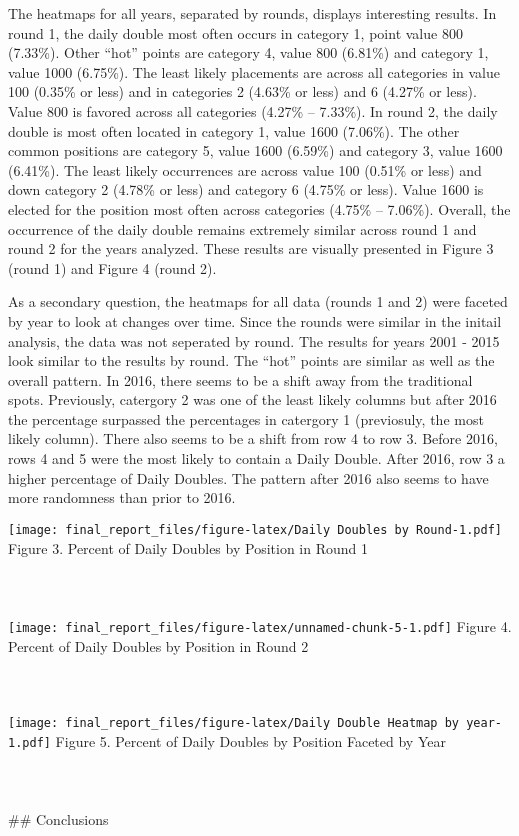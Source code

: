 \documentclass[]{article}
\begin{document}
The heatmaps for all years, separated by rounds, displays interesting
results. In round 1, the daily double most often occurs in category 1,
point value 800 (7.33\%). Other ``hot'' points are category 4, value 800
(6.81\%) and category 1, value 1000 (6.75\%). The least likely
placements are across all categories in value 100 (0.35\% or less) and
in categories 2 (4.63\% or less) and 6 (4.27\% or less). Value 800 is
favored across all categories (4.27\% -- 7.33\%). In round 2, the daily
double is most often located in category 1, value 1600 (7.06\%). The
other common positions are category 5, value 1600 (6.59\%) and category
3, value 1600 (6.41\%). The least likely occurrences are across value
100 (0.51\% or less) and down category 2 (4.78\% or less) and category 6
(4.75\% or less). Value 1600 is elected for the position most often
across categories (4.75\% -- 7.06\%). Overall, the occurrence of the
daily double remains extremely similar across round 1 and round 2 for
the years analyzed. These results are visually presented in Figure 3
(round 1) and Figure 4 (round 2).

As a secondary question, the heatmaps for all data (rounds 1 and 2) were
faceted by year to look at changes over time. Since the rounds were
similar in the initail analysis, the data was not seperated by round.
The results for years 2001 - 2015 look similar to the results by round.
The ``hot'' points are similar as well as the overall pattern. In 2016,
there seems to be a shift away from the traditional spots. Previously,
catergory 2 was one of the least likely columns but after 2016 the
percentage surpassed the percentages in catergory 1 (previosuly, the
most likely column). There also seems to be a shift from row 4 to row 3.
Before 2016, rows 4 and 5 were the most likely to contain a Daily
Double. After 2016, row 3 a higher percentage of Daily Doubles. The
pattern after 2016 also seems to have more randomness than prior to
2016.

\texttt{[image: final\_report\_files/figure-latex/Daily Doubles by Round-1.pdf]}
Figure 3. Percent of Daily Doubles by Position in Round 1\\
~\\
~\\
~\\
\texttt{[image: final\_report\_files/figure-latex/unnamed-chunk-5-1.pdf]}
Figure 4. Percent of Daily Doubles by Position in Round 2\\
~\\
~\\
~\\
\texttt{[image: final\_report\_files/figure-latex/Daily Double Heatmap by year-1.pdf]}
Figure 5. Percent of Daily Doubles by Position Faceted by Year\\
~\\
~\\
~\\
\#\# Conclusions
\end{document}
